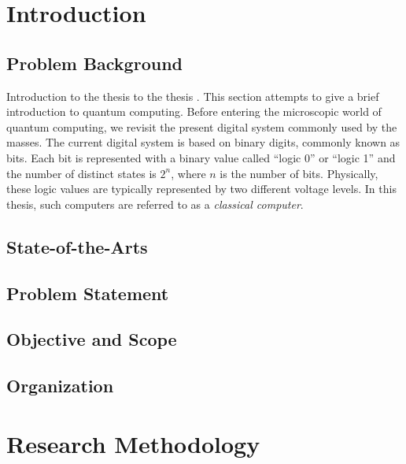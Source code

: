 \documentclass{utmthesis}
\begin{document}
\tableofcontents
\listoftables
\listoffigures


\listofabbre
{}


\listofsymbols
{}


\listofappendices

\onehalfspacing
\mainmatter


\chapter{Introduction}
\section{Problem Background}
Introduction to the thesis \cite{b2} to the thesis \cite{okamoto2004improved}. This section attempts to give a brief introduction to quantum computing. Before entering the microscopic world of quantum computing, we revisit the present digital system commonly used by the masses.  The current digital system is based on binary digits, commonly known as bits.  Each bit is represented with a binary value called ``logic 0'' or ``logic 1'' and the number of distinct states is $2^n$, where $n$ is the number of bits.  Physically, these logic values are typically represented by two different voltage levels. In this thesis, such computers are referred to as a \emph{classical computer}.
\section{State-of-the-Arts}
\section{Problem Statement}
\section{Objective and Scope}
\section{Organization}




\chapter{Research Methodology}
\end{document}
